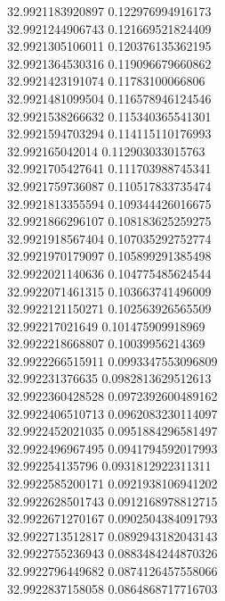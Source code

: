 {32.9921183920897	0.122976994916173\\
32.9921244906743	0.121669521824409\\
32.9921305106011	0.120376135362195\\
32.9921364530316	0.119096679660862\\
32.9921423191074	0.11783100066806\\
32.9921481099504	0.116578946124546\\
32.9921538266632	0.115340365541301\\
32.9921594703294	0.114115110176993\\
32.992165042014	0.112903033015763\\
32.9921705427641	0.111703988745341\\
32.9921759736087	0.110517833735474\\
32.9921813355594	0.109344426016675\\
32.9921866296107	0.108183625259275\\
32.9921918567404	0.107035292752774\\
32.9921970179097	0.105899291385498\\
32.9922021140636	0.104775485624544\\
32.9922071461315	0.103663741496009\\
32.9922121150271	0.102563926565509\\
32.992217021649	0.101475909918969\\
32.9922218668807	0.10039956214369\\
32.9922266515911	0.0993347553096809\\
32.992231376635	0.0982813629512613\\
32.9922360428528	0.0972392600489162\\
32.9922406510713	0.0962083230114097\\
32.9922452021035	0.0951884296581497\\
32.9922496967495	0.0941794592017993\\
32.992254135796	0.0931812922311311\\
32.9922585200171	0.0921938106941202\\
32.9922628501743	0.0912168978812715\\
32.9922671270167	0.0902504384091793\\
32.9922713512817	0.0892943182043143\\
32.9922755236943	0.0883484244870326\\
32.9922796449682	0.0874126457558066\\
32.9922837158058	0.0864868717716703\\
}
